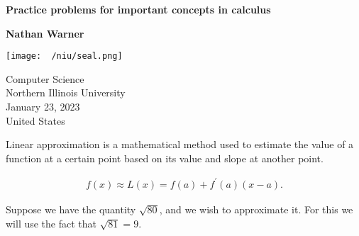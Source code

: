 \documentclass{report}
\title{\Huge{}}
\author{\huge{Nathan Warner}}
\date{\huge{}}
\begin{document}
        \begin{titlepage}
       \begin{center}
           \vspace*{1cm}
    
           \textbf{Practice problems for important concepts in calculus}
    
           \vspace{0.5cm}
            
                
           \vspace{1.5cm}
    
           \textbf{Nathan Warner}
    
           \vfill
                
                
           \vspace{0.8cm}
         
           \texttt{[image: ~/niu/seal.png]}
                
           Computer Science \\
           Northern Illinois University\\
           January 23, 2023 \\
           United States\\
           
                
       \end{center}
    \end{titlepage}
    \tableofcontents
    \pagebreak 
    \bigbreak \noindent 
    \begin{concept}
        Linear approximation is a mathematical method used to estimate the value of a function at a certain point based on its value and slope at another point. 
    \end{concept}
    \bigbreak \noindent 
    \begin{remark}
        \begin{align*}
            f(x) \approx L(x) = f(a) + f^{\prime}(a)(x-a)
        .\end{align*}
    \end{remark}
    \bigbreak \noindent 
    Suppose we have the quantity $\sqrt{80}$, and we wish to approximate it. For this we will use the fact that $\sqrt{81} = 9$. 
    
    
\end{document}

